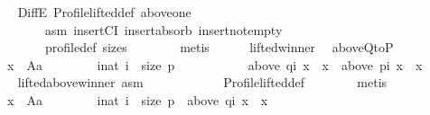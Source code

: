 \begin{isabellebody}
\ \ \ \ \ \ \isamarkupfalse%
\ DiffE\ Profile{\isachardot}{\kern0pt}lifted{\isacharunderscore}{\kern0pt}def\ above{\isacharunderscore}{\kern0pt}one{}\isanewline
\ \ \ \ \ \ \ \ \ \ \ \ asm{}\ insertCI\ insert{\isacharunderscore}{\kern0pt}absorb\ insert{\isacharunderscore}{\kern0pt}not{\isacharunderscore}{\kern0pt}empty\isanewline
\ \ \ \ \ \ \ \ \ \ \ \ profile{\isacharunderscore}{\kern0pt}def\ sizes\isanewline
\ \ \ \ \ \ \isamarkupfalse%
\ metis\isanewline
\ \ \ \ \isamarkupfalse%
\ lifted{\isacharunderscore}{\kern0pt}winner\ \isamarkupfalse%
\ above{\isacharunderscore}{\kern0pt}QtoP{\isacharcolon}{\kern0pt}\isanewline
\ \ \ \ \ \ {\isachardoublequoteopen}{\isasymforall}x\ {\isasymin}\ A{\isacharminus}{\kern0pt}{\isacharbraceleft}{\kern0pt}a{\isacharbraceright}{\kern0pt}{\isachardot}{\kern0pt}\isanewline
\ \ \ \ \ \ \ \ {\isasymforall}i{\isacharcolon}{\kern0pt}{\isacharcolon}{\kern0pt}nat{\isachardot}{\kern0pt}\ i\ {\isacharless}{\kern0pt}\ size\ p\ {\isasymlongrightarrow}\isanewline
\ \ \ \ \ \ \ \ \ \ {\isacharparenleft}{\kern0pt}above\ {\isacharparenleft}{\kern0pt}q{\isacharbang}{\kern0pt}i{\isacharparenright}{\kern0pt}\ x\ {\isacharequal}{\kern0pt}\ {\isacharbraceleft}{\kern0pt}x{\isacharbraceright}{\kern0pt}\ {\isasymlongrightarrow}\ above\ {\isacharparenleft}{\kern0pt}p{\isacharbang}{\kern0pt}i{\isacharparenright}{\kern0pt}\ x\ {\isacharequal}{\kern0pt}\ {\isacharbraceleft}{\kern0pt}x{\isacharbraceright}{\kern0pt}{\isacharparenright}{\kern0pt}{\isachardoublequoteclose}\isanewline
\ \ \ \ \ \ \isamarkupfalse%
\ lifted{\isacharunderscore}{\kern0pt}above{\isacharunderscore}{\kern0pt}winner{}\ asm{}\isanewline
\ \ \ \ \ \ \ \ \ \ \ \ Profile{\isachardot}{\kern0pt}lifted{\isacharunderscore}{\kern0pt}def\isanewline
\ \ \ \ \ \ \isamarkupfalse%
\ metis\isanewline
\ \ \ \ \isamarkupfalse%
\isanewline
\ \ \ \ \ \ {\isachardoublequoteopen}{\isasymforall}x\ {\isasymin}\ A{\isacharminus}{\kern0pt}{\isacharbraceleft}{\kern0pt}a{\isacharbraceright}{\kern0pt}{\isachardot}{\kern0pt}\isanewline
\ \ \ \ \ \ \ \ {\isacharbraceleft}{\kern0pt}i{\isacharcolon}{\kern0pt}{\isacharcolon}{\kern0pt}nat{\isachardot}{\kern0pt}\ i\ {\isacharless}{\kern0pt}\ size\ p\ {\isasymand}\ above\ {\isacharparenleft}{\kern0pt}q{\isacharbang}{\kern0pt}i{\isacharparenright}{\kern0pt}\ x\ {\isacharequal}{\kern0pt}\ {\isacharbraceleft}{\kern0pt}x{\isacharbraceright}{\kern0pt}{\isacharbraceright}{\kern0pt}\ {\isasymsubseteq}\isanewline

\end{isabellebody}

